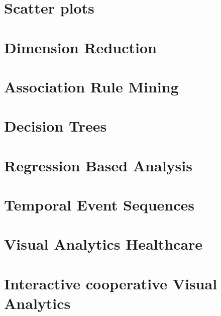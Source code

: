 \documentclass[11pt,ngerman]{article}
\begin{document}
\section{Scatter plots}


\section{Dimension Reduction}


\section{Association Rule Mining}


\section{Decision Trees}


\section{Regression Based Analysis}


\section{Temporal Event Sequences}


\section{Visual Analytics Healthcare}


\section{Interactive cooperative Visual Analytics}
\end{document}
